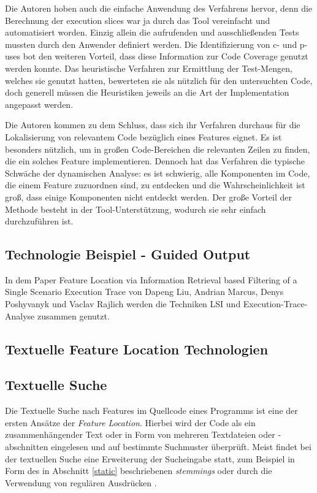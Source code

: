 \documentclass[runningheads,a4paper]{llncs}
\begin{document}
Die Autoren hoben auch die einfache Anwendung des Verfahrens hervor, denn die Berechnung der execution slices war ja durch das Tool vereinfacht und automatisiert worden. Einzig allein die aufrufenden und ausschließenden Tests mussten durch den Anwender definiert werden. Die Identifizierung von c- und p-uses bot den weiteren Vorteil, dass diese Information zur Code Coverage genutzt werden konnte. Das heuristische Verfahren zur Ermittlung der Test-Mengen, welches sie genutzt hatten, bewerteten sie als nützlich für den untersuchten Code, doch generell müssen die Heuristiken jeweils an die Art der Implementation angepasst werden.

Die Autoren kommen zu dem Schluss, dass sich ihr Verfahren durchaus für die Lokalisierung von relevantem Code bezüglich eines Features eignet. Es ist besonders nützlich, um in großen Code-Bereichen die relevanten Zeilen zu finden, die ein solches Feature implementieren. Dennoch hat das Verfahren die typische Schwäche der dynamischen Analyse: es ist schwierig, alle Komponenten im Code, die einem Feature zuzuordnen sind, zu entdecken und die Wahrscheinlichkeit ist groß, dass einige Komponenten nicht entdeckt werden. Der große Vorteil der Methode besteht in der Tool-Unterstützung, wodurch sie sehr einfach durchzuführen ist. 

\subsection*{Technologie Beispiel - Guided Output}

In dem Paper Feature Location via Information Retrieval based Filtering of a Single Scenario Execution Trace von Dapeng Liu, Andrian Marcus, Denys Poshyvanyk und Vaclav Rajlich werden die Techniken LSI und Execution-Trace-Analyse zusammen genutzt. 

\subsection{Textuelle Feature Location Technologien}

\subsection*{Textuelle Suche}

Die Textuelle Suche nach Features im Quellcode eines Programms ist eine der ersten Ansätze der \textit{Feature Location}. Hierbei wird der Code als ein zusammenhängender Text oder in Form von mehreren Textdateien oder -abschnitten eingelesen und auf bestimmte Suchmuster überprüft. Meist findet bei der textuellen Suche eine Erweiterung der Sucheingabe statt, zum Beispiel in Form des in Abschnitt \ref{static} beschriebenen \textit{stemmings} oder durch die Verwendung von regulären Ausdrücken \cite{grep}.
\end{document}
